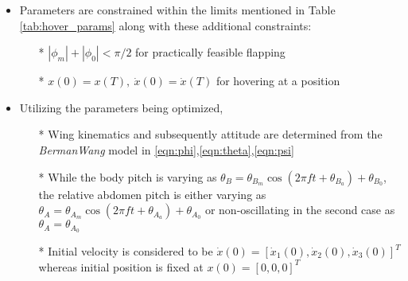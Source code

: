 \documentclass[10pt]{article}
\begin{document}
\begin{itemize}
	\item Parameters are constrained within the limits mentioned in Table \ref{tab:hover_params} along with these additional constraints:
	\begin{itemize}
		\item[*] $ |\phi_m| + |\phi_0| < \pi/2 $ for practically feasible flapping
		\item[*] $ x(0) = x(T),\ \dot{x}(0) = \dot{x}(T) $ for hovering at a position
	\end{itemize}
	\item Utilizing the parameters being optimized,
	\begin{itemize}
		\item[*] Wing kinematics and subsequently attitude are determined from the \textit{BermanWang} model in \eqref{eqn:phi},\eqref{eqn:theta},\eqref{eqn:psi}
		\item[*] While the body pitch is varying as $ \theta_B = \theta_{B_m} \cos{(2 \pi f t + \theta_{B_a})} + \theta_{B_0} $, the relative abdomen pitch is either varying as $ \theta_A = \theta_{A_m} \cos{(2 \pi f t + \theta_{A_a})} + \theta_{A_0} $ or non-oscillating in the second case as $ \theta_A = \theta_{A_0} $
		\item[*] Initial velocity is considered to be $ \dot{x}(0) = [\dot{x}_1(0), \dot{x}_2(0), \dot{x}_3(0)]^T $ whereas initial position is fixed at $ x(0) = [0, 0, 0]^T $
	\end{itemize}
\end{itemize}
\end{document}
